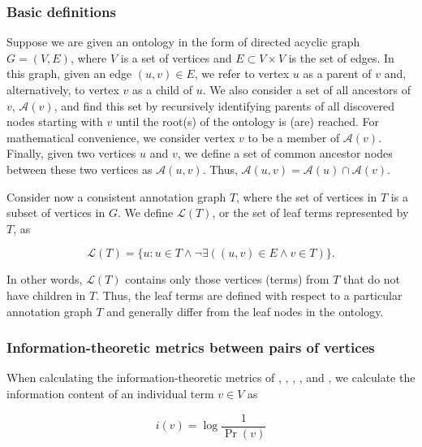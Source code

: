 \subsubsection{Basic definitions}

Suppose we are given an ontology in the form of directed acyclic graph $G=(V, E)$, where $V$ is a set of vertices and $E\subset V\times V$ is the set of edges. In this graph, given an edge $(u,v) \in E$, we refer to vertex $u$ as a parent of $v$ and, alternatively, to vertex $v$ as a child of $u$. We also consider a set of all ancestors of $v$, $\mathcal{A}(v)$, and find this set by recursively identifying parents of all discovered nodes starting with $v$ until the root(s) of the ontology is (are) reached. For mathematical convenience, we consider vertex $v$ to be a member of $\mathcal{A}(v)$. Finally, given two vertices $u$ and $v$, we define a set of common ancestor nodes between these two vertices as $\mathcal{A}(u,v)$. Thus, $\mathcal{A}(u,v)= \mathcal{A}(u)\cap \mathcal{A}(v)$.

Consider now a consistent annotation graph $T$, where the set of vertices in $T$ is a subset of vertices in $G$. We define $\mathcal{L}(T)$, or the set of leaf terms represented by $T$, as

\begin{equation}
\mathcal{L}(T)=\{u : u \in T \land \lnot\exists ( (u, v) \in E  \land v \in T)\}.
\end{equation}

\noindent
In other words, $\mathcal{L}(T)$ contains only those vertices (terms) from $T$ that do not have children in $T$. Thus, the leaf terms are defined with respect to a particular annotation graph $T$ and generally differ from the leaf nodes in the ontology. 

\subsubsection{Information-theoretic metrics between pairs of vertices}

When calculating the information\hyp{}theoretic metrics of \citet{Resnik1995}, \citet{Jiang1997}, \citet{Lin1998}, \citet{Lord2003}, and \citet{Schlicker2006}, we calculate the information content of an individual term $v \in V$ as

\begin{equation}
i(v)=\log\frac{1}{\Pr(v)}
\end{equation}

